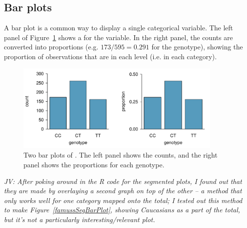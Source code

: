 \begin{doublespace}

\subsection{Bar plots}
A bar plot is a common way to display a single categorical variable. The left panel of Figure~\ref{famussBarPlot} shows a  for the  variable. In the right panel, the counts are converted into proportions (e.g. $173/595=0.291$ for the  genotype), showing the proportion of observations that are in each level (i.e. in each category).

\begin{figure}[bht]
	\centering
	\includegraphics[width=0.9\textwidth]{ch_intro_to_data_oi_biostat/figures/famussBarPlot/famussBarPlot}
	\caption{Two bar plots of . The left panel shows the counts, and the right panel shows the proportions for each genotype.}
	\label{famussBarPlot}
\end{figure}

\textit{JV: After poking around in the R code for the segmented plots, I found out that they are made by overlaying a second graph on top of the other -- a method that only works well for one category mapped onto the total; I tested out this method to make Figure~\ref{famussSegBarPlot}, showing Caucasians as a part of the total, but it's not a particularly interesting/relevant plot.} 
	

\end{doublespace}
